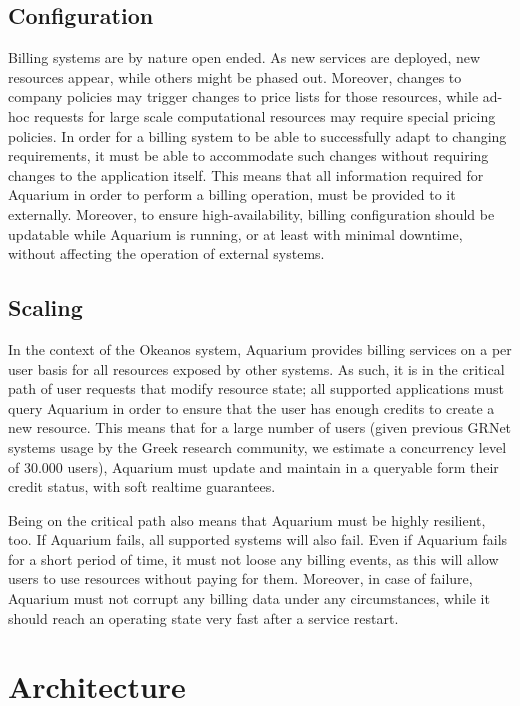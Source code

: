 \documentclass[preprint,10pt]{sigplanconf}
\begin{document}
\subsection{Configuration}

Billing systems are by nature open ended. As new services are deployed, new
resources appear, while others might be phased out.  Moreover, changes to
company policies may trigger changes to price lists for those resources, while
ad-hoc requests for large scale computational resources may require special
pricing policies. In order for a billing system to be able to successfully
adapt to changing requirements, it must be able to accommodate such changes
without requiring changes to the application itself. This means that all
information required for Aquarium in order to perform a billing operation,
must be provided to it externally. Moreover, to ensure high-availability,
billing configuration should be updatable while Aquarium is running, or at
least with minimal downtime, without affecting the operation of external
systems.


\subsection{Scaling}

In the context of the Okeanos system, Aquarium provides billing services on a
per user basis for all resources exposed by other systems. As such, it is in
the critical path of user requests that modify resource state; all supported
applications must query Aquarium in order to ensure that the user has enough
credits to create a new resource. This means that for a large number of users
(given previous GRNet systems usage by the Greek research community, we
estimate a concurrency level of 30.000 users), Aquarium must update and
maintain in a queryable form their credit status, 
with soft realtime guarantees. 

Being on the critical path also means that Aquarium must be highly resilient,
too. If Aquarium fails, all supported systems will also fail. Even if Aquarium
fails for a short period of time, it must not loose any billing events, as this
will allow users to use resources without paying for them. Moreover, in case of
failure, Aquarium must not corrupt any billing data under any circumstances,
while it should reach an operating state very fast after a service restart.

\section{Architecture}

\end{document}
